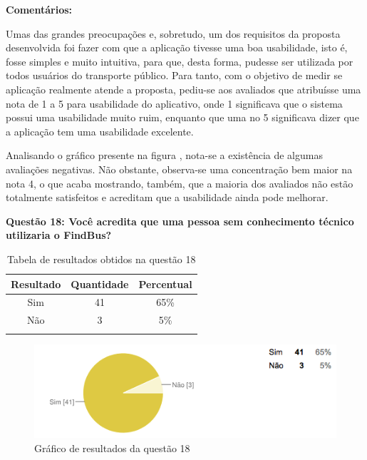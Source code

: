 \textbf{Comentários:}

Umas das grandes preocupações e, sobretudo, um dos requisitos da proposta desenvolvida foi fazer com que a aplicação tivesse uma boa usabilidade, isto é, fosse simples e muito intuitiva, para que, desta forma, pudesse ser utilizada por todos usuários do transporte público. Para tanto, com o objetivo de medir se aplicação realmente atende a proposta, pediu-se aos avaliados que atribuísse uma nota de 1 a 5 para usabilidade do aplicativo, onde 1 significava que o sistema possui uma usabilidade muito ruim, enquanto que uma no 5 significava dizer que a aplicação tem uma usabilidade excelente.
	
Analisando o gráfico presente na figura , nota-se a existência de algumas avaliações negativas. Não obstante, observa-se uma concentração bem maior na nota 4, o que acaba mostrando, também, que a maioria dos avaliados não estão totalmente satisfeitos e acreditam que a usabilidade ainda pode melhorar. \newline

\textbf{Questão 18: Você acredita que uma pessoa sem conhecimento técnico utilizaria o FindBus?}


\begin{center}
\begin{longtable}{c|c|c}
\hline
    \multicolumn{1}{c}{\textbf{Resultado}} & \multicolumn{1}{c}{\textbf{Quantidade}} & \multicolumn{1}{c}{\textbf{Percentual}} \\
\hline
    Sim & 41 &  65\%\\
    \hline
    Não & 3 & 5\%\\
    \hline
\caption{Tabela de resultados obtidos na questão 18}
\label{tabq18}
\end{longtable}
\end{center}

\begin{figure}[h]
\begin{center}
  \includegraphics[width=16cm]{images/graficos/questao18.png}
  \caption{Gráfico de resultados da questão 18}
  \label{fig:questao18}
\end{center}
\end{figure}

